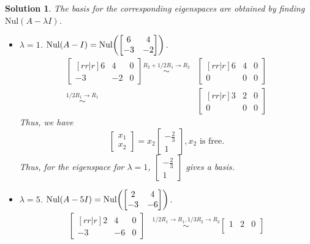\documentclass[11pt]{scrartcl}
\theoremstyle{dotlessP}
\newtheorem{sol}{Solution}[section]
\theoremstyle{dotlessN}
\DeclarePairedDelimiter\paren{(}{)} %
\newcommand{\nul}{\text{Nul}}
\begin{document}
\begin{sol}
	The basis for the corresponding eigenspaces are obtained by finding $\nul(A - \lambda I)$.
	\begin{itemize}
		\item $\lambda = 1$. $\nul(A - I) = \nul \paren*{
\begin{bmatrix}
	6 & 4 \\
	-3 & -2
\end{bmatrix}
			}$. 
			\begin{align*}
				\begin{bmatrix}[rr|r]
					6 &4 & 0 \\
					-3 & -2 & 0 
				\end{bmatrix} \stackrel{R_2 + 1/2 R_1 \to R_2}{\sim}			
				&\begin{bmatrix}[rr|r]
					6 &4 & 0 \\
					0 & 0 & 0 
				\end{bmatrix} \\
\stackrel{1/2 R_1 \to R_1}{\sim}			
				&\begin{bmatrix}[rr|r]
					3 &2 & 0 \\
					0 & 0 & 0 
				\end{bmatrix}
			\end{align*}
			Thus, we have
			\[
			\begin{bmatrix}
				x_1 \\
				x_2
			\end{bmatrix} =
			x_2
			\begin{bmatrix}
				-\frac{2}{3} \\
				1
			\end{bmatrix}, x_2 \text{ is free.}
			\] 
			Thus, for the eigenspace for $\lambda = 1$, $
			\begin{bmatrix}
				-\frac{2}{3} \\
				1
			\end{bmatrix}
			$ gives a basis.
		\item $\lambda = 5$. $\nul(A - 5I) = \nul \paren*{
\begin{bmatrix}
	2 & 4 \\
	-3 & -6
\end{bmatrix}
			}$. 
	\begin{align*}
		\begin{bmatrix}[rr|r]
			2 & 4 & 0 \\
			-3 & -6 & 0 
		\end{bmatrix} &\stackrel{1/2 R_1 \to R_1, 1/3R_2 \to R_2}{\sim} 
		\begin{bmatrix}
			1 & 2 & 0 \\

\end{bmatrix}
\end{align*}
\end{itemize}
\end{sol}
\end{document}
